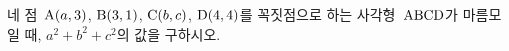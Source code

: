 네 점~$\mathrm{A}(a{,}\mkern3mu\mathopen{}3)$, $\mathrm{B}(3{,}\mkern3mu\mathopen{}1)$, $\mathrm{C}(b{,}\mkern3mu\mathopen{}c)$, $\mathrm{D}(4{,}\mkern3mu\mathopen{}4)$를 꼭짓점으로 하는 사각형~$\mathrm{ABCD}$가 마름모일 때, $a^2+b^2+c^2$의 값을 구하시오.
